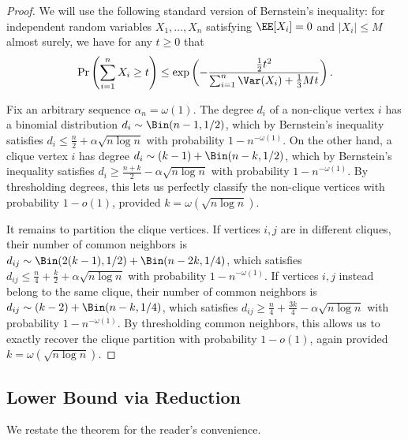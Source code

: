 \documentclass{article}
\begin{document}
\begin{proof}
We will use the following standard version of Bernstein's inequality: for independent random variables $X_1,\ldots,X_n$ satisfying $\EE[X_i] = 0$ and $|X_i| \le M$ almost surely, we have for any $t \ge 0$ that
\[ \Pr\left(\sum_{i=1}^n X_i \ge t\right) \le \exp\left(-\frac{\frac{1}{2}t^2}{\sum_{i=1}^n \Var(X_i) + \frac{1}{3}Mt}\right). \]

Fix an arbitrary sequence $\alpha_n = \omega(1)$. The degree $d_i$ of a non-clique vertex $i$ has a binomial distribution $d_i \sim \Bin(n-1,1/2)$, which by Bernstein's inequality satisfies $d_i \le \frac{n}{2} + \alpha\sqrt{n \log n}$ with probability $1-n^{-\omega(1)}$. On the other hand, a clique vertex $i$ has degree $d_i \sim (k-1) + \Bin(n-k,1/2)$, which by Bernstein's inequality satisfies $d_i \ge \frac{n+k}{2} - \alpha\sqrt{n \log n}$ with probability $1-n^{-\omega(1)}$. By thresholding degrees, this lets us perfectly classify the non-clique vertices with probability $1-o(1)$, provided $k = \omega(\sqrt{n \log n})$.

It remains to partition the clique vertices. If vertices $i,j$ are in different cliques, their number of common neighbors is $d_{ij} \sim \Bin(2(k-1),1/2) + \Bin(n-2k,1/4)$, which satisfies $d_{ij} \le \frac{n}{4} + \frac{k}{2} + \alpha\sqrt{n \log n}$ with probability $1-n^{-\omega(1)}$. If vertices $i,j$ instead belong to the same clique, their number of common neighbors is $d_{ij} \sim (k-2) + \Bin(n-k,1/4)$, which satisfies $d_{ij} \ge \frac{n}{4} + \frac{3k}{4} - \alpha\sqrt{n \log n}$ with probability $1-n^{-\omega(1)}$. By thresholding common neighbors, this allows us to exactly recover the clique partition with probability $1-o(1)$, again provided $k = \omega(\sqrt{n \log n})$.
\end{proof}


\subsection{Lower Bound via Reduction}

We restate the theorem for the reader's convenience.

\thmrecoverylower*
\end{document}
